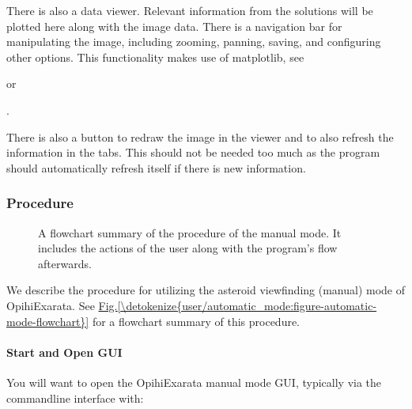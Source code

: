\documentclass[letterpaper,11pt,english]{sphinxmanual}
\begin{document}
\sphinxAtStartPar
There is also a data viewer. Relevant information from the solutions will be
plotted here along with the image data. There is a navigation bar for
manipulating the image, including zooming, panning, saving, and configuring
other options. This functionality makes use of matplotlib, see
%
\begin{footnote}[4]\sphinxAtStartFootnote
{}
%
\end{footnote}
or %
\begin{footnote}[5]\sphinxAtStartFootnote
{}
%
\end{footnote}.

\sphinxAtStartPar
There is also a  button to redraw the image in the
viewer and to also refresh the information in the tabs. This should not be
needed too much as the program should automatically refresh itself if there
is new information.


\subsubsection{Procedure}
\label{\detokenize{user/manual_mode:procedure}}
\begin{figure}[htbp]
\centering
\capstart

\noindent{}
\caption{A flowchart summary of the procedure of the manual mode. It includes
the actions of the user along with the program’s flow afterwards.}\label{\detokenize{user/manual_mode:id3}}\label{\detokenize{user/manual_mode:figure-manual-mode-flowchart}}\end{figure}

\sphinxAtStartPar
We describe the procedure for utilizing the asteroid view\sphinxhyphen{}finding (manual)
mode of OpihiExarata. See \hyperref[\detokenize{user/automatic_mode:figure-automatic-mode-flowchart}]{Fig.\@ \ref{\detokenize{user/automatic_mode:figure-automatic-mode-flowchart}}} for a
flowchart summary of this procedure.


\paragraph{Start and Open GUI}
\label{\detokenize{user/manual_mode:start-and-open-gui}}
\sphinxAtStartPar
You will want to open the OpihiExarata manual mode GUI, typically via the
command\sphinxhyphen{}line interface with:
\end{document}
